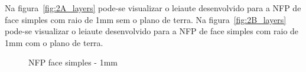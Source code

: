Na figura~\ref{fig:2A_layers} pode-se visualizar o leiaute desenvolvido para a NFP de face simples com raio de 1mm sem o plano de terra. Na figura~\ref{fig:2B_layers} pode-se visualizar o leiaute desenvolvido para a NFP de face simples com raio de 1mm com o plano de terra.
\begin{figure}[htb!]
	\centering
 	\caption{NFP face simples - 1mm}
\end{figure}

